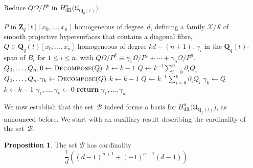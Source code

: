 \documentclass[a4paper,11pt]{article}
\numberwithin{equation}{section}
\newcommand{\ZZ}{\mathbf{Z}} %
\newcommand{\QQ}{\mathbf{Q}} %
\providecommand{\HdR}{H_{\text{dR}}}    %
\providecommand{\cB}{\mathcal{B}} %
\theoremstyle{definition}
\newtheorem{prop}[thm]{Proposition}
\begin{document}
\begin{algorithm}
\caption{Reduce $Q \Omega / P^k$ in $\HdR^n\bigl(\mathfrak{U}_{\QQ_q(t)}\bigr)$}
\label{alg:PoleRed}
\begin{algorithmic}
\vspace{1mm}
\Require $P$ in $\ZZ_q[t][x_0, \dotsc, x_n]$ homogeneous of degree~$d$, 
         defining a family $\mathcal{X}/\mathcal{S}$ of smooth projective 
         hypersurfaces that contains a diagonal fibre, $Q \in \QQ_q(t)[x_0, \dotsc, x_n]$ 
         homogeneous of degree $kd - (n+1)$.
\Ensure  $\gamma_i$ in the $\QQ_q(t)$-span of $B_i$ for $1 \leq i \leq n$, with  
         $Q \Omega / P^k \equiv \gamma_{1} \Omega / P^{1} + \dotsb + \gamma_n \Omega / P^n$.
\State $Q_0, \dotsc, Q_n, 0 \gets \Call{Decompose}{Q}$
\State $k \gets k-1$
\State $Q \gets k^{-1} \sum_{i=0}^n \partial_i Q_i$
\EndWhile
\While{$Q \not \in \QQ_q(t)$-span of $B_k$}
\State $Q_0, \dotsc, Q_n, \gamma_k \gets \Call{Decompose}{Q}$
\State $k \gets k-1$
\State $Q \gets k^{-1} \sum_{i=0}^n \partial_i Q_i$
\EndWhile
{}
\State $\gamma_{k} \gets Q$
\State $k \gets k-1$
\EndIf
\State $\gamma_{1}, \dotsc, \gamma_{k} \gets 0$
\State \textbf{return} $\gamma_{1}, \dotsc, \gamma_n$
\EndProcedure
\end{algorithmic}
\end{algorithm}

We now establish that the set~$\cB$ indeed forms a basis for 
$\HdR^n\bigl(\mathfrak{U}_{\QQ_q(t)}\bigr)$, as announced before.  
We start with an auxiliary result describing the cardinality of 
the set~$\cB$.

\begin{prop} \label{prop:BasisSize}
The set $\cB$ has cardinality
\begin{equation*}
\frac{1}{d} \left((d-1)^{n+1} + (-1)^{n+1}(d-1) \right).
\end{equation*}
\end{prop}
\end{document}
